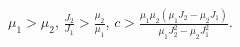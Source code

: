 $\mu _1 > \mu _2$,
$\frac{J_2}{J_1} > \frac{\mu _2}{\mu _1}$,
$c > \frac{\mu _1\mu _2(\mu _1J_2 - \mu _2J_1)}{\mu _1J^2_2 - \mu _2J^2_1}$.
